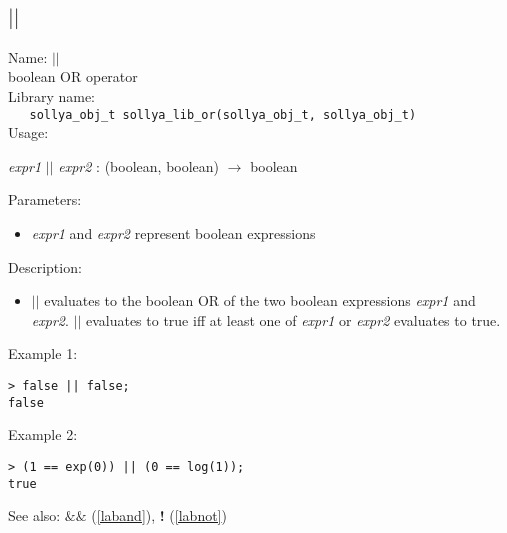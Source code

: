 \subsection{$||$}
\label{labor}
\noindent Name: \textbf{$||$}\\
\phantom{aaa}boolean OR operator\\[0.2cm]
\noindent Library name:\\
\verb|   sollya_obj_t sollya_lib_or(sollya_obj_t, sollya_obj_t)|\\[0.2cm]
\noindent Usage: 
\begin{center}
\emph{expr1} \textbf{$||$} \emph{expr2} : (\textsf{boolean}, \textsf{boolean}) $\rightarrow$ \textsf{boolean}\\
\end{center}
Parameters: 
\begin{itemize}
\item \emph{expr1} and \emph{expr2} represent boolean expressions
\end{itemize}
\noindent Description: \begin{itemize}

\item \textbf{$||$} evaluates to the boolean OR of the two
   boolean expressions \emph{expr1} and \emph{expr2}. \textbf{$||$} evaluates to 
   true iff at least one of \emph{expr1} or \emph{expr2} evaluates to true.
\end{itemize}
\noindent Example 1: 
\begin{center}\begin{minipage}{15cm}\begin{Verbatim}[frame=single]
> false || false;
false
\end{Verbatim}
\end{minipage}\end{center}
\noindent Example 2: 
\begin{center}\begin{minipage}{15cm}\begin{Verbatim}[frame=single]
> (1 == exp(0)) || (0 == log(1));
true
\end{Verbatim}
\end{minipage}\end{center}
See also: \textbf{$\&\&$} (\ref{laband}), \textbf{!} (\ref{labnot})
